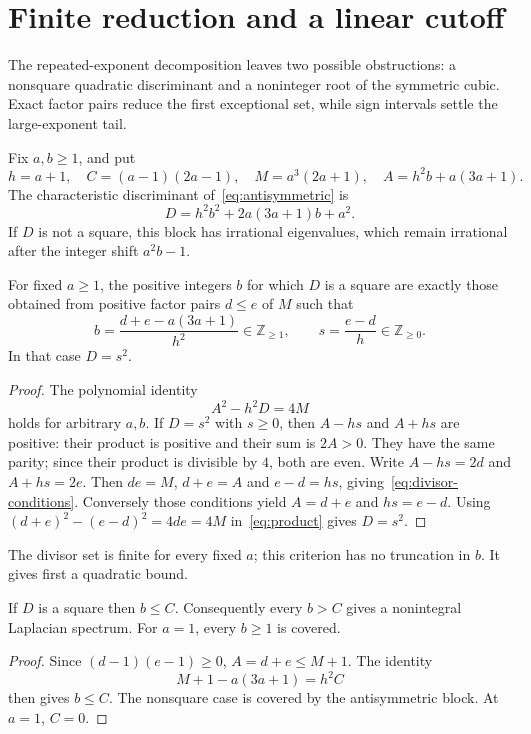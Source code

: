 \section{Finite reduction and a linear cutoff}
\label{sec:bounds}

The repeated-exponent decomposition leaves two possible obstructions:
a nonsquare quadratic discriminant and a noninteger root of the symmetric
cubic. Exact factor pairs reduce the first exceptional set, while sign
intervals settle the large-exponent tail.

Fix $a,b\geq1$, and put
\[
h=a+1,\quad C=(a-1)(2a-1),\quad M=a^3(2a+1),\quad
A=h^2b+a(3a+1).
\]
The characteristic discriminant of~\eqref{eq:antisymmetric} is
\begin{equation}
\label{eq:discriminant}
D=h^2b^2+2a(3a+1)b+a^2.
\end{equation}
If $D$ is not a square, this block has irrational eigenvalues, which
remain irrational after the integer shift $a^2b-1$.

\begin{proposition}
\label{prop:divisors}
For fixed $a\geq1$, the positive integers $b$ for which $D$ is a square
are exactly those obtained from positive factor pairs $d\leq e$ of $M$
such that
\begin{equation}
\label{eq:divisor-conditions}
b=\frac{d+e-a(3a+1)}{h^2}\in\mathbb Z_{\geq1},\qquad
s=\frac{e-d}{h}\in\mathbb Z_{\geq0}.
\end{equation}
In that case $D=s^2$.
\end{proposition}
\begin{proof}
The polynomial identity
\begin{equation}
\label{eq:product}
A^2-h^2D=4M
\end{equation}
holds for arbitrary $a,b$. If $D=s^2$ with $s\geq0$, then
$A-hs$ and $A+hs$ are positive: their product is positive and their sum
is $2A>0$. They have the same parity; since their product is divisible
by $4$, both are even. Write $A-hs=2d$ and $A+hs=2e$.
Then $de=M$, $d+e=A$ and $e-d=hs$, giving~\eqref{eq:divisor-conditions}.
Conversely those conditions yield $A=d+e$ and $hs=e-d$.
Using $(d+e)^2-(e-d)^2=4de=4M$ in~\eqref{eq:product} gives $D=s^2$.
\end{proof}

The divisor set is finite for every fixed $a$; this criterion has no
truncation in $b$. It gives first a quadratic bound.

\begin{corollary}
\label{cor:quadratic}
If $D$ is a square then $b\leq C$. Consequently every $b>C$ gives
a nonintegral Laplacian spectrum. For $a=1$, every $b\geq1$ is covered.
\end{corollary}
\begin{proof}
Since $(d-1)(e-1)\geq0$, $A=d+e\leq M+1$. The identity
\[
M+1-a(3a+1)=h^2C
\]
then gives $b\leq C$. The nonsquare case is covered by the antisymmetric
block. At $a=1$, $C=0$.
\end{proof}

